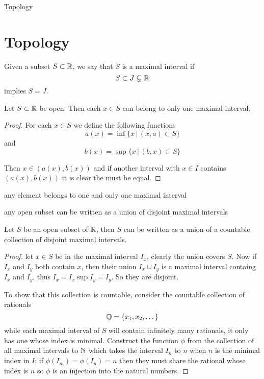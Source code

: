 \begin{chapter}{Topology}
    \section{Topology}
    
    \begin{defn}
        Given a subset $S \subset \mathbb{R}$, we say that $S$ is a maximal interval if 
        \[S \subset J \subsetneq \mathbb{R}\]
        implies $S = J$. 
    \end{defn}

    
    \begin{thm}
        Let $S \subset \mathbb{R}$ be open. Then each $x \in S$ can belong to only one maximal interval.
    \end{thm}

    
    \begin{proof}
        For each $x \in S$ we define the following functions 
        \[a(x) = \inf\{x \, | \, (x, a) \subset S\}\]
        and 
        \[b(x) = \sup\{x \, | \, (b, x) \subset S\}\]

        Then $x \in (a(x), b(x))$ and if another interval with $x \in I$ contains $(a(x), b(x))$ it is clear the must be equal. 
    \end{proof}


    any element belongs to one and only one maximal interval


    
    any open subset can be written as a union of disjoint maximal intervals 

    
    \begin{thm}
        Let $S$ be an open subset of $\mathbb{R}$, then $S$ can be written as a union of a countable collection of disjoint maximal intervals. 
    \end{thm}

    
    \begin{proof}
        let $x \in S$ be in the maximal interval $I_x$, clearly the union covers $S$. Now if $I_x$ and $I_y$ both contain $x$, then their union 
        $I_x \cup I_y$ is a maximal interval containg $I_x$ and $I_y$, thus $I_x = I_x \sup I_y = I_y$. So they are disjoint. 

        To show that this collection is countable, consider the countable collection of rationals 
        \[\mathbb{Q} = \{x_1, x_2, \dots\}\]
        while each maximal interval of $S$ will contain infinitely many rationals, it only has one whose index is minimal. Construct the function $\phi$ from the collection of all maximal
        intervals to $\mathbb{N}$ which takes the interval $I_n$ to $n$ when $n$ is the minimal index in $I$; if $\phi(I_m) = \phi(I_n) = n$ then they must share the rational whose index is $n$ so 
        $\phi$ is an injection into the natural numbers.   
    \end{proof}
    


\end{chapter}

